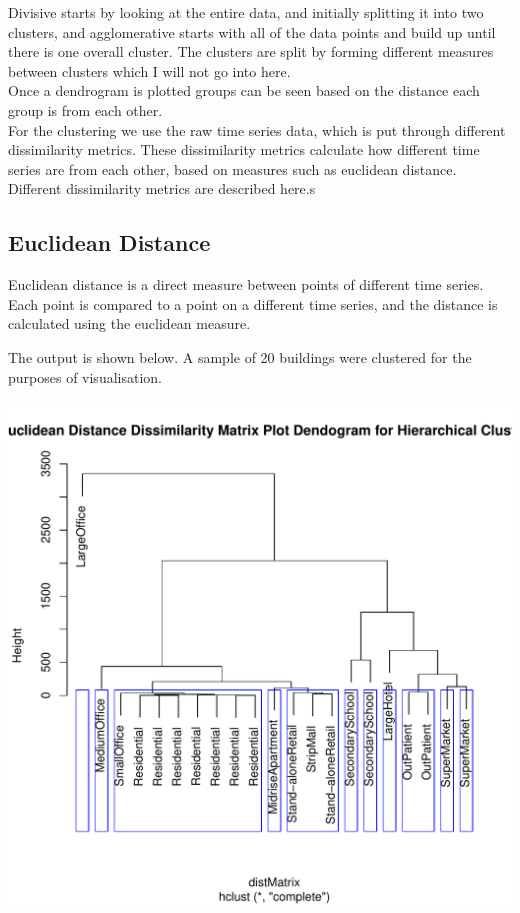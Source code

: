 \documentclass[12pt]{article}\usepackage[]{graphicx}\usepackage[]{color}
\makeatletter
\def\maxwidth{ %
  \ifdim\Gin@nat@width>\linewidth
    \linewidth
  \else
    \Gin@nat@width
  \fi
}
\newenvironment{knitrout}{}{} %
\makeatother
\begin{document}
Divisive starts by looking at the entire data, and initially splitting it into two clusters, and agglomerative starts with all of the data points and build up until there is one overall cluster. The clusters are split by forming different measures between clusters which I will not go into here.\\

Once a dendrogram is plotted groups can be seen based on the distance each group is from each other. \\

For the clustering we use the raw time series data, which is put through different dissimilarity metrics. These dissimilarity metrics calculate how different time series are from each other, based on measures such as euclidean distance. \\

Different dissimilarity metrics are described here.s

\subsection{Euclidean Distance}

Euclidean distance is a direct measure between points of different time series. Each point is compared to a point on a different time series, and the distance is calculated using the euclidean measure.

The output is shown below. A sample of 20 buildings were clustered for the purposes of visualisation.


\begin{knitrout}
\color{fgcolor}
\includegraphics[width=\maxwidth]{figure/heirarchical_clustering-1} 

\end{knitrout}
\end{document}
